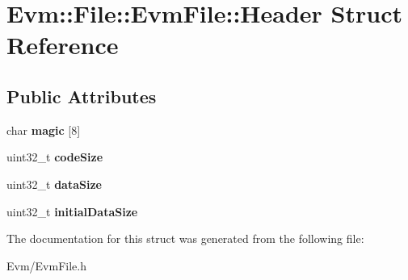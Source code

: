 \hypertarget{struct_evm_1_1_file_1_1_evm_file_1_1_header}{}\section{Evm\+:\+:File\+:\+:Evm\+File\+:\+:Header Struct Reference}
\label{struct_evm_1_1_file_1_1_evm_file_1_1_header}
\subsection*{Public Attributes}
\begin{DoxyCompactItemize}
\item 
\mbox{\label{struct_evm_1_1_file_1_1_evm_file_1_1_header_a1626b86e5361c1ef9d6a2908a2671067}} 
char {\bfseries magic} \mbox{[}8\mbox{]}
\item 
\mbox{\label{struct_evm_1_1_file_1_1_evm_file_1_1_header_aa065e8a05b184f006f57522ff46b442a}} 
uint32\+\_\+t {\bfseries code\+Size}
\item 
\mbox{\label{struct_evm_1_1_file_1_1_evm_file_1_1_header_a34491776d9893594f1f52d3a4f644db9}} 
uint32\+\_\+t {\bfseries data\+Size}
\item 
\mbox{\label{struct_evm_1_1_file_1_1_evm_file_1_1_header_aba896e5d58983d7623e5e822ca619680}} 
uint32\+\_\+t {\bfseries initial\+Data\+Size}
\end{DoxyCompactItemize}


The documentation for this struct was generated from the following file\+:\begin{DoxyCompactItemize}
\item 
Evm/Evm\+File.\+h\end{DoxyCompactItemize}

